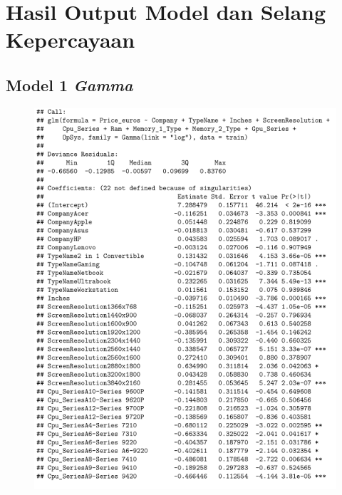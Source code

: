 \documentclass[12pt]{article}
\begin{document}
\section{Hasil Output Model dan Selang Kepercayaan}
\subsection{Model 1 \textit{Gamma}}
\label{Model_1_Gamma}
\begin{figure}[h!]
    \centering
    \includegraphics{Model_1_Sum(1_3).png}
    \label{fig:SUM11}
\end{figure}
\end{document}
